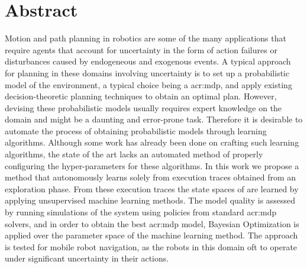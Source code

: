 \chapter*{Abstract}
\label{ch:abstract}

Motion and path planning in robotics are some of the many applications that require agents that account for uncertainty in the form of action failures or disturbances caused by endogeneous and exogenous events.
A typical approach for planning in these domains involving uncertainty is to set up a probabilistic model of the environment, a typical choice being a \acrfull{acr:mdp}, and apply existing decision-theoretic planning techniques to obtain an optimal plan.
However, devising these probabilistic models usually requires expert knowledge on the domain and might be a daunting and error-prone task.
Therefore it is desirable to automate the process of obtaining probabilistic models through learning algorithms.
Although some work has already been done on crafting such learning algorithms, the state of the art lacks an automated method of properly configuring the hyper-parameters for these algorithms.
In this work we propose a method that autonomously learns  solely from execution traces obtained from an exploration phase.
From these execution traces the state spaces of  are learned by applying unsupervised machine learning methods.
The model quality is assessed by running simulations of the system using policies from standard \acrshort{acr:mdp} solvers, and in order to obtain the best \acrshort{acr:mdp} model, Bayesian Optimization is applied over the parameter space of the machine learning method.
The approach is tested for mobile robot navigation, as the robots in this domain oft to operate under significant uncertainty in their actions.

%
%

